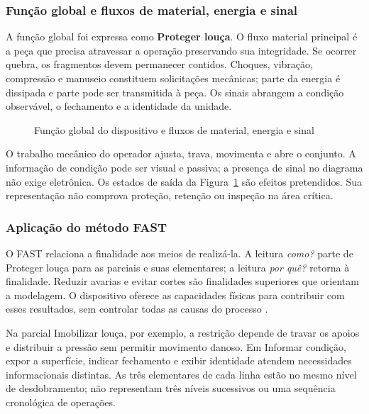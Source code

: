 \subsubsection{Função global e fluxos de material, energia e sinal}

A função global foi expressa como \textbf{Proteger louça}. O fluxo material principal é a peça que precisa atravessar a operação preservando sua integridade. Se ocorrer quebra, os fragmentos devem permanecer contidos. Choques, vibração, compressão e manuseio constituem solicitações mecânicas; parte da energia é dissipada e parte pode ser transmitida à peça. Os sinais abrangem a condição observável, o fechamento e a identidade da unidade.

\begin{figure}[H]
\centering
\caption{Função global do dispositivo e fluxos de material, energia e sinal}
\label{fig:funcao-global}
\end{figure}

O trabalho mecânico do operador ajusta, trava, movimenta e abre o conjunto. A informação de condição pode ser visual e passiva; a presença de sinal no diagrama não exige eletrônica. Os estados de saída da Figura~\ref{fig:funcao-global} são efeitos pretendidos. Sua representação não comprova proteção, retenção ou inspeção na área crítica.



\subsubsection{Aplicação do método FAST}

O FAST relaciona a finalidade aos meios de realizá-la. A leitura \textit{como?} parte de Proteger louça para as parciais e suas elementares; a leitura \textit{por quê?} retorna à finalidade. Reduzir avarias e evitar cortes são finalidades superiores que orientam a modelagem. O dispositivo oferece as capacidades físicas para contribuir com esses resultados, sem controlar todas as causas do processo \citep{back2008,aulasmodelagem}.

Na parcial Imobilizar louça, por exemplo, a restrição depende de travar os apoios e distribuir a pressão sem permitir movimento danoso. Em Informar condição, expor a superfície, indicar fechamento e exibir identidade atendem necessidades informacionais distintas. As três elementares de cada linha estão no mesmo nível de desdobramento; não representam três níveis sucessivos ou uma sequência cronológica de operações.

